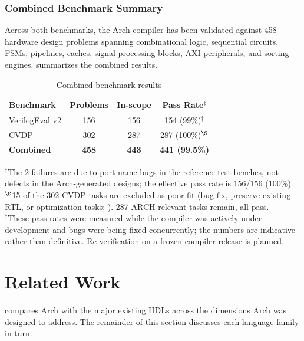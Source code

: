 \documentclass[11pt,twocolumn]{article}
\begin{document}
\subsubsection{Combined Benchmark Summary}

Across both benchmarks, the Arch compiler has been validated against 458 hardware design problems spanning combinational logic, sequential circuits, FSMs, pipelines, caches, signal processing blocks, AXI peripherals, and sorting engines.  summarizes the combined results.

\begin{table}[t]
\centering
\caption{Combined benchmark results}
\label{tab:combined}
\footnotesize
\begin{tabular}{@{}lccc@{}}
\toprule
\textbf{Benchmark} & \textbf{Problems} & \textbf{In-scope} & \textbf{Pass Rate}$^\ddagger$ \\
\midrule
VerilogEval v2 & 156 & 156 & 154 (99\%)$^\dagger$ \\
CVDP & 302 & 287 & 287 (100\%)$^\S$ \\
\midrule
\textbf{Combined} & \textbf{458} & \textbf{443} & \textbf{441 (99.5\%)} \\
\bottomrule
\end{tabular}

\vspace{0.5em}
\raggedright\footnotesize
$^\dagger$The 2 failures are due to port-name bugs in the reference test benches, not defects in the Arch-generated designs; the effective pass rate is 156/156 (100\%).\\
$^\S$15 of the 302 CVDP tasks are excluded as poor-fit (bug-fix, preserve-existing-RTL, or optimization tasks; ). 287 ARCH-relevant tasks remain, all pass.\\
$^\ddagger$These pass rates were measured while the compiler was actively under development and bugs were being fixed concurrently; the numbers are indicative rather than definitive. Re-verification on a frozen compiler release is planned.
\end{table}

\section{Related Work}\label{sec:related}

 compares Arch with the major existing HDLs across the dimensions Arch was designed to address. The remainder of this section discusses each language family in turn.
\end{document}
